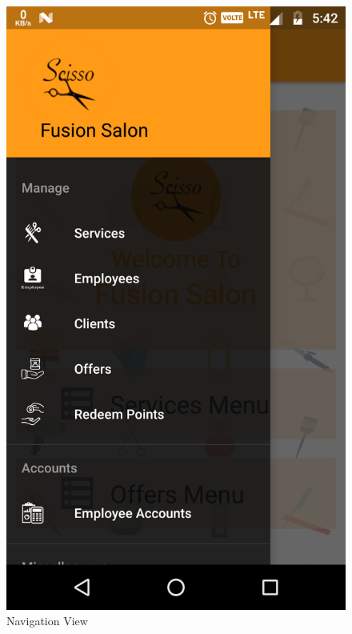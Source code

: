 \begin{figure}[h]
	\centering
	\includegraphics[width=0.7\linewidth]{NavigationView}
	\caption{Navigation View}
\end{figure}
\pagebreak

